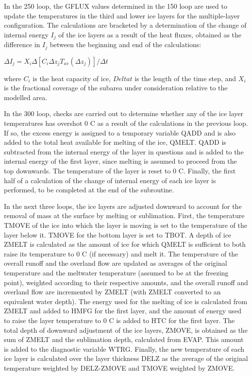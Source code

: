 In the 250 loop, the G\+F\+L\+U\+X values determined in the 150 loop are used to update the temperatures in the third and lower ice layers for the multiple-\/layer configuration. The calculations are bracketed by a determination of the change of internal energy $I_j$ of the ice layers as a result of the heat fluxes, obtained as the difference in $I_j$ between the beginning and end of the calculations\+:

$\Delta I_j = X_i \Delta[C_i \Delta z_j T_{av}(\Delta z_j)]/ \Delta t$

where $C_i$ is the heat capacity of ice, $Delta t$ is the length of the time step, and $X_i$ is the fractional coverage of the subarea under consideration relative to the modelled area.

In the 300 loop, checks are carried out to determine whether any of the ice layer temperatures has overshot 0 C as a result of the calculations in the previous loop. If so, the excess energy is assigned to a temporary variable Q\+A\+D\+D and is also added to the total heat available for melting of the ice, Q\+M\+E\+L\+T. Q\+A\+D\+D is subtracted from the internal energy of the layer in questions and is added to the internal energy of the first layer, since melting is assumed to proceed from the top downwards. The temperature of the layer is reset to 0 C. Finally, the first half of a calculation of the change of internal energy of each ice layer is performed, to be completed at the end of the subroutine.

In the next three loops, the ice layers are adjusted downward to account for the removal of mass at the surface by melting or sublimation. First, the temperature T\+M\+O\+V\+E of the ice into which the layer is moving is set to the temperature of the layer below it. T\+M\+O\+V\+E for the bottom layer is set to T\+B\+O\+T. A depth of ice Z\+M\+E\+L\+T is calculated as the amount of ice for which Q\+M\+E\+L\+T is sufficient to both raise its temperature to 0 C (if necessary) and melt it. The temperature of the overall runoff and the overland flow are updated as averages of the original temperature and the meltwater temperature (assumed to be at the freezing point), weighted according to their respective amounts, and the overall runoff and overland flow are incremented by Z\+M\+E\+L\+T (with Z\+M\+E\+L\+T converted to an equivalent water depth). The energy used for the melting of ice is calculated from Z\+M\+E\+L\+T and added to H\+M\+F\+G for the first layer, and the amount of energy used to raise the layer temperature to 0 C is added to H\+T\+C for the first layer. The total depth of downward adjustment of the ice layers, Z\+M\+O\+V\+E, is obtained as the sum of Z\+M\+E\+L\+T and the sublimation depth, calculated from E\+V\+A\+P. This amount is added to the diagnostic variable W\+T\+R\+G. Finally, the new temperature of each ice layer is calculated over the layer thickness D\+E\+L\+Z as the average of the original temperature weighted by D\+E\+L\+Z-\/\+Z\+M\+O\+V\+E and T\+M\+O\+V\+E weighted by Z\+M\+O\+V\+E.

